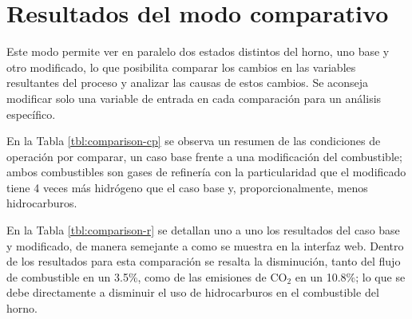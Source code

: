 \section{Resultados del modo comparativo}
\par Este modo permite ver en paralelo dos estados distintos del horno, uno base y otro modificado, lo que posibilita comparar los cambios en las variables resultantes del proceso y analizar las causas de estos cambios. Se aconseja modificar solo una variable de entrada en cada comparación para un análisis específico.
\par En la Tabla \ref{tbl:comparison-cp} se observa un resumen de las condiciones de operación por comparar, un caso base frente a una modificación del combustible; ambos combustibles son gases de refinería con la particularidad que el modificado tiene 4 veces más hidrógeno que el caso base y, proporcionalmente, menos hidrocarburos.
\par En la Tabla \ref{tbl:comparison-r} se detallan uno a uno los resultados del caso base y modificado, de manera semejante a como se muestra en la interfaz web. Dentro de los resultados para esta comparación se resalta la disminución, tanto del flujo de combustible en un 3.5\%, como de las emisiones de CO$_2$ en un 10.8\%; lo que se debe directamente a disminuir el uso de hidrocarburos en el combustible del horno.

